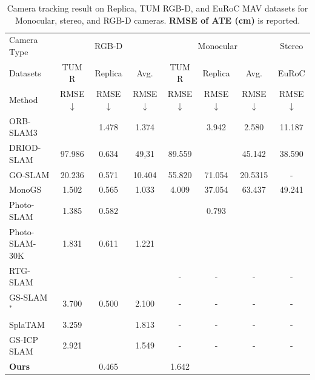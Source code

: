 \begin{table}
\fontsize{6.5}{8}\selectfont
  \centering
   \setlength\tabcolsep{1pt} 
  \begin{tabular}{@{}l|ccc|ccc|c} %
    \hline   
     Camera Type & \multicolumn{3}{c|}{ RGB-D} & \multicolumn{3}{c|}{Monocular} & {Stereo} \\
    Datasets & TUM R & Replica & Avg. & TUM R & Replica& Avg. & EuRoC \\
   Method &  RMSE $\downarrow$ &RMSE $\downarrow$   &RMSE $\downarrow$ &  RMSE $\downarrow$ &RMSE $\downarrow$ &  RMSE $\downarrow$ &RMSE $\downarrow$  \\
    \hline  
        {ORB-SLAM3 \cite{ORB-SLAM32021}} &\cellcolor{lightyellow}{1.269}  	& 1.478	&  1.374 &\cellcolor{lightred}{\bf1.218 }  &3.942 & 2.580 &11.187	 \\
        {DRIOD-SLAM \cite{DROID-SLAM2021}} &97.986  	&0.634 	& 49,31 &89.559   &\cellcolor{lightorange}{0.725} & 45.142 & 38.590 	 \\
        {GO-SLAM \cite{GO-SLAM2023}} &20.236  	&0.571 	& 10.404 &55.820   &71.054	& 20.5315 &-\\
        {MonoGS \cite{MonoGS2024}}& 1.502 & 0.565 &  1.033 & 4.009 & 37.054 &  63.437 &	49.241 \\
        {Photo-SLAM \cite{Photo-SLAM2024}} & 1.385	&0.582 &  \cellcolor{lightyellow}{0.984}	&\cellcolor{lightyellow}{1.539} & 0.793 &  \cellcolor{lightyellow}{1.166} &	\cellcolor{lightyellow}{11.023}\\
        {Photo-SLAM-30K } & 1.831	&0.611 &  1.221	&\cellcolor{lightorange}{1.367} & \cellcolor{lightyellow}{0.748} &  \cellcolor{lightred}{\bf1.058} &	\cellcolor{lightorange}{10.876}\\
        RTG-SLAM \cite{RTG-SLAM2024}    & \cellcolor{lightred}{\bf0.985} & \cellcolor{lightorange}{0.191} &   \cellcolor{lightred}{\bf 0.581} & - 	  &- & - 	&- \\
        GS-SLAM$^*$ \cite{GS-SLAM2024} &3.700	&0.500	 & 2.100  & - 	  &- &  -	&-\\
        {SplaTAM \cite{SplaTAM2024}} & 3.259 & \cellcolor{lightyellow}{0.366} & 1.813  & - 	  &- &  -	&- \\
        {GS-ICP SLAM \cite{GS-ICPSLAM2024}}   &2.921	& \cellcolor{lightred}{\bf0.177} &1.549	& -  &- &-	&-\\
        \hline
        {\bf Ours}  & \cellcolor{lightorange}{ 1.080} & 0.465 & \cellcolor{lightorange}{0.768}  & 1.642 & \cellcolor{lightred}{\bf 0.512} &  \cellcolor{lightorange}{1.077} & \cellcolor{lightred}{\bf 7.462} \\
    \hline
  \end{tabular}
  \caption{Camera tracking result on Replica, TUM RGB-D, and EuRoC MAV datasets for Monocular, stereo, and RGB-D cameras.  {\bf RMSE of ATE (\rm{cm})} is reported. }
  \label{tab:tracking}
\end{table}

